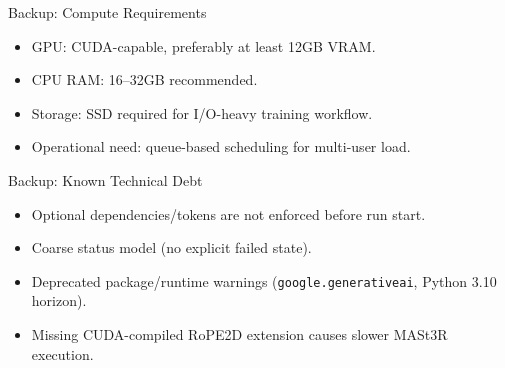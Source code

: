 \documentclass[aspectratio=169]{beamer}
\begin{document}
\appendix

\begin{frame}{Backup: Compute Requirements}
\begin{itemize}
  \item GPU: CUDA-capable, preferably at least 12GB VRAM.
  \item CPU RAM: 16--32GB recommended.
  \item Storage: SSD required for I/O-heavy training workflow.
  \item Operational need: queue-based scheduling for multi-user load.
\end{itemize}
\end{frame}

\begin{frame}{Backup: Known Technical Debt}
\begin{itemize}
  \item Optional dependencies/tokens are not enforced before run start.
  \item Coarse status model (no explicit failed state).
  \item Deprecated package/runtime warnings (\texttt{google.generativeai}, Python 3.10 horizon).
  \item Missing CUDA-compiled RoPE2D extension causes slower MASt3R execution.
\end{itemize}
\end{frame}
\end{document}
